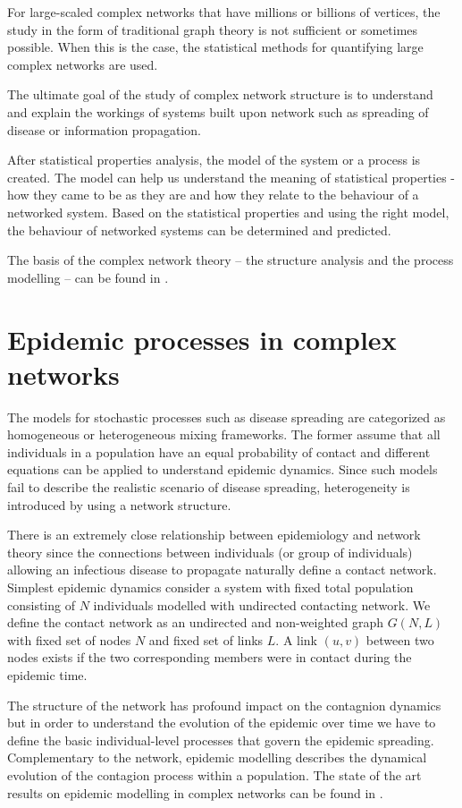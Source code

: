 \documentclass[times, utf8, diplomski]{fer}
\begin{document}
For large-scaled complex networks that have millions or billions of vertices, the study in the form of traditional graph theory is not sufficient or sometimes possible. When this is the case, the statistical methods  for quantifying large complex networks are used. 

The ultimate goal of the study of complex network structure is to understand and explain the workings of systems built upon network such as spreading of disease or information propagation.

After statistical properties analysis, the model of the system or a process  is created. The model can help us understand the meaning of statistical properties - how they came to be as they are and how they relate to the behaviour of a networked system. Based on the statistical properties and using the right model, the behaviour of networked systems can be determined and predicted.

The basis of the complex network theory -- the structure  analysis and the process modelling -- can be found in \citet{Newman03thestructure}.

\section{Epidemic processes in complex networks}

The models for stochastic processes such as disease spreading are categorized as homogeneous or heterogeneous mixing frameworks. The former assume that all individuals in a population have an equal probability of contact and different equations can be applied to understand epidemic dynamics. Since such models fail to describe the realistic scenario of disease spreading,  heterogeneity is introduced by using a network structure.


There is an extremely close relationship between epidemiology and network theory since the connections between individuals (or group of individuals) allowing an infectious disease to propagate naturally define a contact network. Simplest epidemic dynamics consider a system with fixed total population consisting of $N$ individuals modelled with undirected contacting network. We define the contact network as an undirected and non-weighted graph $G(N, L)$ with fixed set of nodes $N$ and fixed set of links $L$. A link $(u, v)$ between two nodes exists if the two corresponding members were in contact during the epidemic time.

The structure of the network has profound impact on the contagnion dynamics but in order to understand the evolution of the epidemic over time we have to define the basic individual-level processes that govern the epidemic spreading. Complementary to the network, epidemic modelling describes the dynamical evolution of the contagion process within a population. The state of the art results on epidemic modelling in complex networks can be found in \citet{revmod}.
\end{document}

